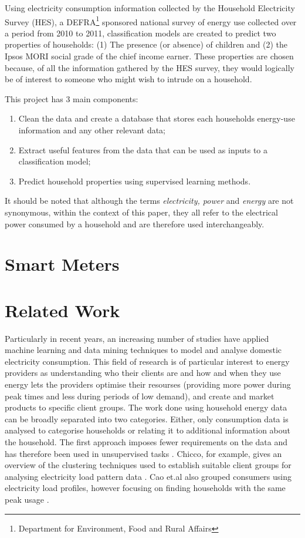 Using electricity consumption information collected by the Household Electricity Survey (HES), a DEFRA\footnote{Department for Environment, Food and Rural Affairs} sponsored national survey of energy use collected over a period from 2010 to 2011, classification models are created to predict two properties of households: (1) The presence (or absence) of children and (2) the Ipsos MORI social grade of the chief income earner. These properties are chosen because, of all the information gathered by the HES survey, they would logically be of interest to someone who might wish to intrude on a household.
\newline

This project has 3 main components:

\begin{enumerate}
\item Clean the data and create a database that stores each households energy-use information and any other relevant data;
\item Extract useful features from the data that can be used as inputs to a classification model; 
\item Predict household properties using supervised learning methods.
\end{enumerate}

It should be noted that although the terms \textit{electricity, power} and \textit{energy} are not synonymous, within the context of this paper, they all refer to the electrical power consumed by a household and are therefore used interchangeably. 


\section{Smart Meters}
\section{Related Work}
\label{sec:previousWork}
Particularly in recent years, an increasing number of studies have applied machine learning and data mining techniques to  model and analyse domestic electricity consumption. This field of research is of particular interest to energy providers as understanding who their clients are and how and when they use energy lets the providers optimise their resourses (providing more power during peak times and less during periods of low demand), and create and market products to specific client groups. The work done using household energy data can be broadly separated into two categories. Either, only consumption data is analysed to categorise households or relating it to additional information about the household. The first approach imposes fewer requirements on the data and has therefore been used in unsupervised tasks \cite{Beckel_3}. Chicco, for example, gives an overview of the clustering techniques used to establish suitable client groups for analysing electricity load pattern data \cite{Chicco}. Cao et.al also grouped consumers using electricity load profiles, however focusing on finding households with the same peak usage \cite{Cao}. 


